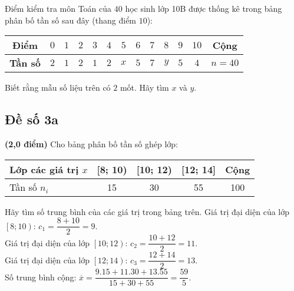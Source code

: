 \begin{bt}%
	Điểm kiểm tra môn Toán của $40$ học sinh lớp 10B được thống kê trong bảng phân bố tần số sau đây (thang điểm $10$):
	\begin{center}
		\begin{tabular}{|c|c|c|c|c|c|c|c|c|c|c|c|c|}
			\hline 
			\bf Điểm &$0$ &$1$&$2$&$3$&$4$&$5$&$6$&$7$&$8$&$9$&$10$& Cộng\\ 
			\hline
			\bf Tần số &$2$ &$1$&$2$&$1$&$2$&$x$&$5$&$7$&$y$&$5$&$4$& $n=40$\\
			\hline
		\end{tabular}
	\end{center}
	Biết rằng mẫu số liệu trên có $2$ mốt. Hãy tìm $x$ và $y$.
\end{bt}



\subsection{Đề số 3a}
\setcounter{bt}{0}
\begin{bt}%
	\textbf{(2,0 điểm)}	
	Cho bảng phân bố tần số ghép lớp: 
	\begin{center}
		\begin{tabular}{|l|c|c|c|c|}
			\hline
			{Lớp các giá trị $x$}&{[8; 10)}&{[10; 12)}&{[12; 14]}&{Cộng}\\
			\hline
			{Tần số $n_i$}&{15}&{30}&{55}&{100}\\
			\hline
		\end{tabular}	
	\end{center}
	Hãy tìm số trung bình của các giá trị trong bảng trên.
	\loigiai
	{
		Giá trị đại diện của lớp $\left[8; 10\right)$: $c_1=\dfrac{8 + 10}{2}=9$.\\ 
		Giá trị đại diện của lớp $\left[10; 12\right)$: $c_2=\dfrac{10 + 12}{2}=11$.\\ 
		Giá trị đại diện của lớp $\left[12; 14\right)$: $c_3=\dfrac{12 + 14}{2}=13$.\\ 
		Số trung bình cộng: $\overline{x}=\dfrac{9.15 + 11.30 + 13.55}{15 + 30 + 55}=\dfrac{59}{5}$.
	}
\end{bt}

